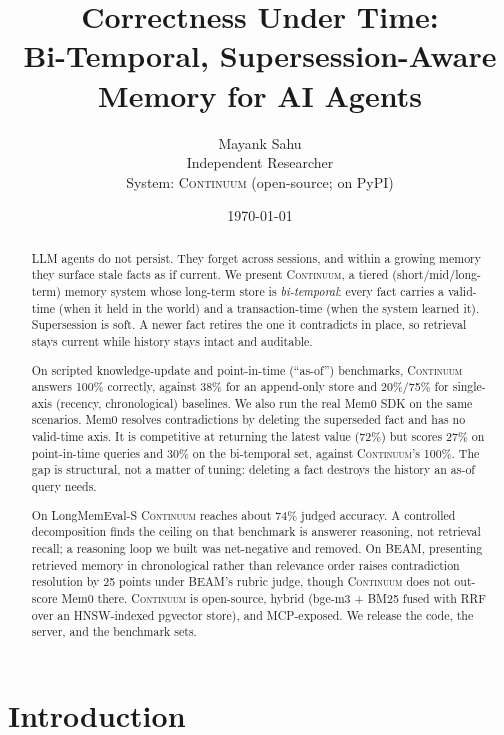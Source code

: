 \documentclass[11pt]{article}
\title{\textbf{Correctness Under Time:} \\ Bi-Temporal, Supersession-Aware Memory for AI Agents}
\author{Mayank Sahu \\ \small Independent Researcher \\ \small System: \textsc{Continuum} (open-source; \code{continuum-mcp} on PyPI)}
\date{\today}
\begin{document}
\maketitle

\begin{abstract}
LLM agents do not persist. They forget across sessions, and within a growing memory they surface
stale facts as if current. We present \textsc{Continuum}, a tiered (short/mid/long-term) memory
system whose long-term store is \emph{bi-temporal}: every fact carries a valid-time (when it held
in the world) and a transaction-time (when the system learned it). Supersession is soft. A newer
fact retires the one it contradicts in place, so retrieval stays current while history stays
intact and auditable.

On scripted knowledge-update and point-in-time (``as-of'') benchmarks, \textsc{Continuum} answers
100\% correctly, against 38\% for an append-only store and 20\%/75\% for single-axis (recency,
chronological) baselines. We also run the real Mem0 SDK on the same scenarios. Mem0 resolves
contradictions by deleting the superseded fact and has no valid-time axis. It is competitive at
returning the latest value (72\%) but scores 27\% on point-in-time queries and 30\% on the
bi-temporal set, against \textsc{Continuum}'s 100\%. The gap is structural, not a matter of tuning:
deleting a fact destroys the history an as-of query needs.

On LongMemEval-S \textsc{Continuum} reaches about 74\% judged accuracy. A controlled decomposition
finds the ceiling on that benchmark is answerer reasoning, not retrieval recall; a reasoning loop
we built was net-negative and removed. On BEAM, presenting retrieved memory in chronological rather
than relevance order raises contradiction resolution by 25 points under BEAM's rubric judge, though
\textsc{Continuum} does not out-score Mem0 there. \textsc{Continuum} is open-source, hybrid (bge-m3
+ BM25 fused with RRF over an HNSW-indexed pgvector store), and MCP-exposed. We release the code,
the server, and the benchmark sets.
\end{abstract}

\section{Introduction}
\end{document}
